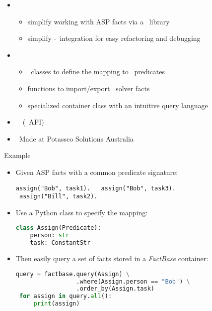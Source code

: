 \begin{frame}{\clorm}
  \begin{itemize}
  \item {} \
    \begin{itemize}
    \item simplify working with ASP facts via a \python\ library
    \item simplify \python-\clingo\ integration for easy refactoring and debugging
      \end{itemize}
  \item {} \
    \begin{itemize}
    \item \python\ classes to define the mapping to \clingo\ predicates
    \item functions to import/export \clingo\ solver facts
    \item specialized container class with an intuitive query language
    \end{itemize}
  \item \structure{Technology}   \ \clingo\ (\python\ API)
  \item \structure{Origin} \ Made at Potassco Solutions Australia
  \end{itemize}
\end{frame}
\begin{frame}[fragile]{Example}

  \begin{itemize}
  \item Given ASP facts with a common predicate signature:
    \par
\begin{lstlisting}[language=clingo,basicstyle=\small\ttfamily]
 assign("Bob", task1).   assign("Bob", task3).
 assign("Bill", task2).
\end{lstlisting}

  \item Use a Python class to specify the mapping:
    \par
\begin{lstlisting}[language=Python, basicstyle=\small\ttfamily]
 class Assign(Predicate):
    person: str
    task: ConstantStr
\end{lstlisting}

  \item Then easily query a set of facts stored in a \emph{FactBase} container:
    \par
\begin{lstlisting}[language=Python, basicstyle=\small\ttfamily]
 query = factbase.query(Assign) \
                 .where(Assign.person == "Bob") \
                 .order_by(Assign.task)
 for assign in query.all():
     print(assign)
\end{lstlisting}
  \end{itemize}
\end{frame}
%

